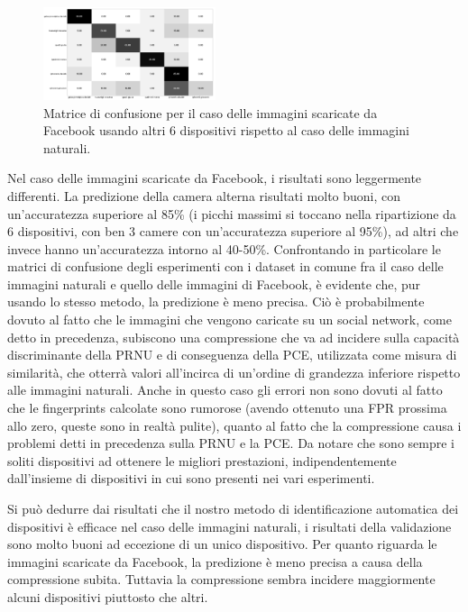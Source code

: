 \begin{figure}[h]
\begin{center}
\includegraphics[width=0.45\textwidth]{images/confusion_matrix_fb_highres_6_bis.png}
\end{center}
  \caption{Matrice di confusione per il caso delle immagini scaricate da Facebook usando altri 6 dispositivi rispetto al caso delle immagini naturali. }
\label{fig:validation}
\end{figure}

Nel caso delle immagini scaricate da Facebook, i risultati sono leggermente differenti. La predizione della camera alterna risultati molto buoni, con un'accuratezza superiore al 85\% (i picchi massimi si toccano nella ripartizione da 6 dispositivi, con ben 3 camere con un'accuratezza superiore al 95\%), ad altri che invece hanno un'accuratezza intorno al 40-50\%. Confrontando in particolare le matrici di confusione degli esperimenti con i dataset in comune fra il caso delle immagini naturali e quello delle immagini di Facebook, è evidente che, pur usando lo stesso metodo, la predizione è meno precisa. Ciò è probabilmente dovuto al fatto che le immagini che vengono caricate su un social network, come detto in precedenza, subiscono una compressione che va ad incidere sulla capacità discriminante della PRNU e di conseguenza della PCE, utilizzata come misura di similarità, che otterrà valori all'incirca di un'ordine di grandezza inferiore rispetto alle immagini naturali. 
Anche in questo caso gli errori non sono dovuti al fatto che le fingerprints calcolate sono rumorose (avendo ottenuto una FPR prossima allo zero, queste sono in realtà pulite), quanto al fatto che la compressione causa i problemi detti in precedenza sulla PRNU e la PCE.
Da notare che sono sempre i soliti dispositivi ad ottenere le migliori prestazioni, indipendentemente dall'insieme di dispositivi in cui sono presenti nei vari esperimenti.

Si può dedurre dai risultati che il nostro metodo di identificazione automatica dei dispositivi è efficace nel caso delle immagini naturali, i risultati della validazione sono molto buoni ad eccezione di un unico dispositivo. Per quanto riguarda le immagini scaricate da Facebook, la predizione è meno precisa a causa della compressione subita. Tuttavia la compressione sembra incidere maggiormente alcuni dispositivi piuttosto che altri.